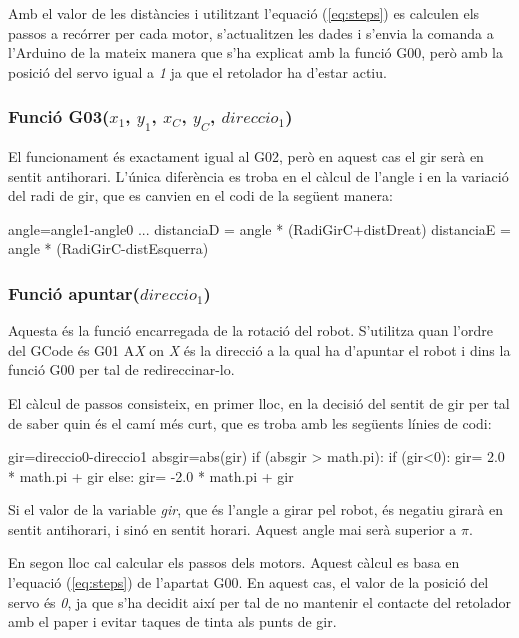 Amb el valor de les distàncies i utilitzant l’equació (\ref{eq:steps}) es calculen els passos a recórrer per cada motor, s’actualitzen les dades i s’envia la comanda a l’Arduino de la mateix manera que s’ha explicat amb la funció G00, però amb la posició del servo igual a \emph{1} ja que el retolador ha d’estar actiu. 

\subsubsection{Funció G03($x_{1}$, $y_{1}$, $x_{C}$, $y_{C}$, $direccio_{1}$)}
El funcionament és exactament igual al G02, però en aquest cas el gir serà en sentit antihorari. L'única diferència es troba en el càlcul de l’angle i en la variació del radi de gir, que es canvien en el codi de la següent manera: \\


\begin{python}
	angle=angle1-angle0
	...
	distanciaD = angle * (RadiGirC+distDreat) 
	distanciaE = angle * (RadiGirC-distEsquerra)
\end{python}
\subsubsection{Funció apuntar($direccio_{1}$)}\label{apuntar}

Aquesta és la funció encarregada de la rotació del robot. S’utilitza quan l’ordre del GCode és G01 A\emph{X} on \emph{X} és la direcció a la qual ha d’apuntar el robot i dins la funció G00 per tal de redireccinar-lo. 

El càlcul de passos consisteix, en primer lloc, en la decisió del sentit de gir per tal de saber quin és el camí més curt, que es troba amb les següents línies de codi:
\begin{python}
	gir=direccio0-direccio1 
	absgir=abs(gir) 
	if (absgir > math.pi):
	if (gir<0):
	gir= 2.0 * math.pi + gir 
	else:
	gir= -2.0 * math.pi + gir
\end{python}
Si el valor de la variable \emph{gir}, que és l’angle a girar pel robot, és negatiu girarà en sentit antihorari, i sinó en sentit horari. Aquest angle mai serà superior a $\pi$. 

En segon lloc cal calcular els passos dels motors. Aquest càlcul es basa en l’equació (\ref{eq:steps}) de l’apartat G00. En aquest cas, el valor de la posició del servo és \emph{0}, ja que s’ha decidit així per tal de no mantenir el contacte del retolador amb el paper i evitar taques de tinta als punts de gir. 





